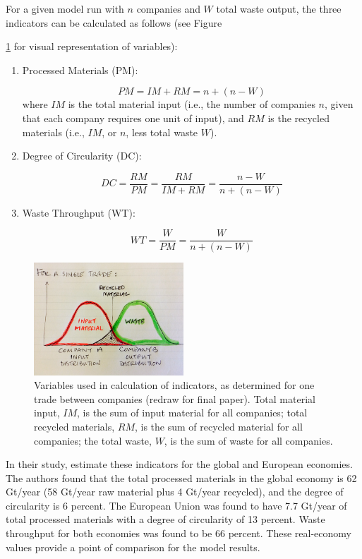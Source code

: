\documentclass[fleqn,10pt]{wlscirep}
\begin{document}
For a given model run with $n$ companies and $W$ total waste output, the three indicators can be calculated as follows (see Figure {\ref{fig:Variables} for visual representation of variables):

\begin{enumerate}
\item Processed Materials (PM): 

\[PM = IM+RM = n+(n-W)\]
where $IM$ is the total material input (i.e., the number of companies $n$, given that each company requires one unit of input), and $RM$ is the recycled materials (i.e., $IM$, or $n$, less total waste $W$).

\item Degree of Circularity (DC):

\[DC = \frac{RM}{PM}=\frac{RM}{IM+RM}=\frac{n-W}{n+(n-W)}\]

\item Waste Throughput (WT):

\[WT = \frac{W}{PM}=\frac{W}{n+(n-W)}\]
\end{enumerate}

\begin{figure}
\centering
\includegraphics[width=0.5\textwidth]{figures/Variables.png}
\caption{\label{fig:Variables}Variables used in calculation of indicators, as determined for one trade between companies (redraw for final paper). Total material input, $IM$, is the sum of input material for all companies; total recycled materials, $RM$, is the sum of recycled material for all companies; the total waste, $W$, is the sum of waste for all companies.}
\end{figure}


In their study, \cite{haas2015circular} estimate these indicators for the global and European economies. The authors found that the total processed materials in the global economy is 62 Gt/year (58 Gt/year raw material plus 4 Gt/year recycled), and the degree of circularity is 6 percent. The European Union was found to have 7.7 Gt/year of total processed materials with a degree of circularity of 13 percent. Waste throughput for both economies was found to be 66 percent. These real-economy values provide a point of comparison for the model results.

}
\end{document}
